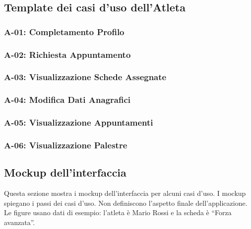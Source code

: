 \subsection{Template dei casi d'uso dell'Atleta}
\subsubsection{A-01: Completamento Profilo}


\subsubsection{A-02: Richiesta Appuntamento}


\subsubsection{A-03: Visualizzazione Schede Assegnate}


\subsubsection{A-04: Modifica Dati Anagrafici}


\subsubsection{A-05: Visualizzazione Appuntamenti}


\subsubsection{A-06: Visualizzazione Palestre}


\subsection{Mockup dell'interfaccia}
Questa sezione mostra i mockup dell'interfaccia per alcuni casi d'uso.
I mockup spiegano i passi dei casi d'uso. Non definiscono l'aspetto
finale dell'applicazione. Le figure usano dati di esempio: l'atleta è
Mario Rossi e la scheda è \enquote{Forza avanzata}.

